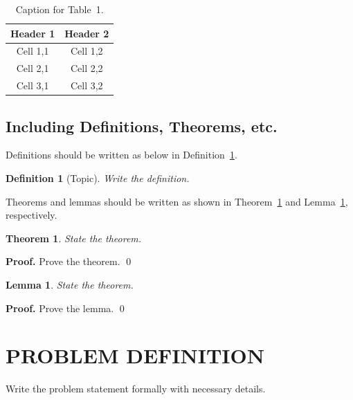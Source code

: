 \documentclass[12pt]{article}
\newtheorem{DEF}{Definition}[section]
\newtheorem{THM}{Theorem}[section]
\newtheorem{LEM}{Lemma}[section]
\begin{document}
\begin{table}[htp]
\begin{center}
\caption{Caption for Table~1.}
\begin{tabular}{|c|c|}
\hline
\textbf{Header 1} & \textbf{Header 2} \\
\hline
Cell 1,1 & Cell 1,2 \\
Cell 2,1 & Cell 2,2 \\
Cell 3,1 & Cell 3,2 \\
\hline
\end{tabular}
\label{Table:1}
\end{center}
\end{table}


\subsection{Including Definitions, Theorems, etc.}
Definitions should be written as below in Definition~\ref{Definition:1}.

\begin{DEF}[Topic]\label{Definition:1}
Write the definition.
\end{DEF}

Theorems and lemmas should be written as shown in Theorem~\ref{Theorem:1} and Lemma~\ref{Lemma:1}, respectively.

\begin{THM}\label{Theorem:1}
State the theorem.
\end{THM}
\vspace{0.05in}
\textbf{Proof.} Prove the theorem.
\qed
\vspace{0.05in}

\begin{LEM}\label{Lemma:1}
State the theorem.
\end{LEM}
\vspace{0.05in}
\textbf{Proof.} Prove the lemma.
\qed
\vspace{0.05in}




\newpage




\section{PROBLEM DEFINITION}
Write the problem statement formally with necessary details.
\end{document}
